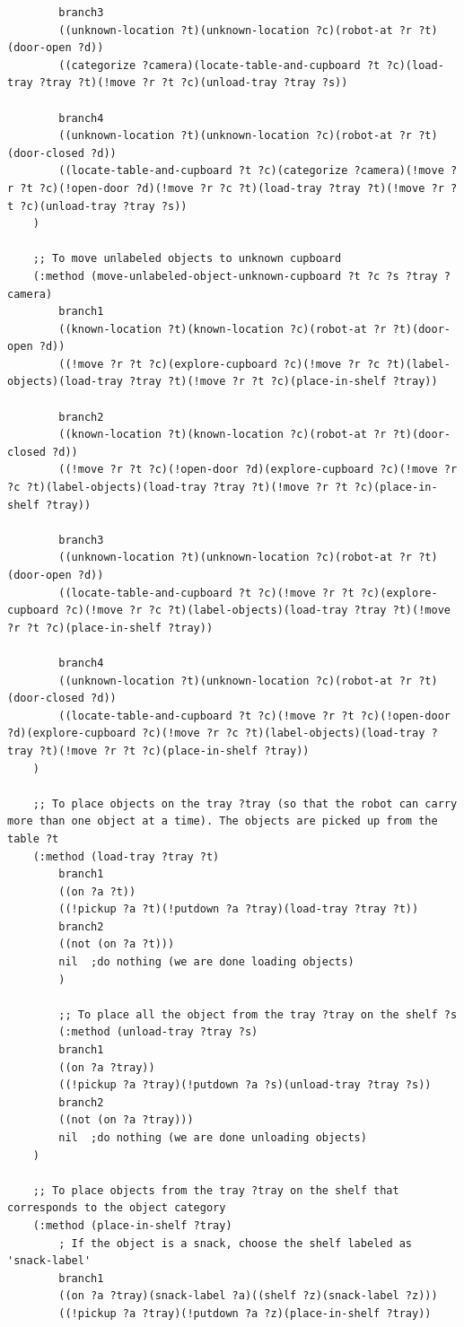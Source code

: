 \documentclass[paper=a4, fontsize=11pt]{scrartcl}
\begin{document}
\begin{lstlisting}
		branch3
		((unknown-location ?t)(unknown-location ?c)(robot-at ?r ?t)(door-open ?d))
		((categorize ?camera)(locate-table-and-cupboard ?t ?c)(load-tray ?tray ?t)(!move ?r ?t ?c)(unload-tray ?tray ?s))

		branch4
		((unknown-location ?t)(unknown-location ?c)(robot-at ?r ?t)(door-closed ?d))
		((locate-table-and-cupboard ?t ?c)(categorize ?camera)(!move ?r ?t ?c)(!open-door ?d)(!move ?r ?c ?t)(load-tray ?tray ?t)(!move ?r ?t ?c)(unload-tray ?tray ?s))
	)

	;; To move unlabeled objects to unknown cupboard
	(:method (move-unlabeled-object-unknown-cupboard ?t ?c ?s ?tray ?camera)
		branch1
		((known-location ?t)(known-location ?c)(robot-at ?r ?t)(door-open ?d))
		((!move ?r ?t ?c)(explore-cupboard ?c)(!move ?r ?c ?t)(label-objects)(load-tray ?tray ?t)(!move ?r ?t ?c)(place-in-shelf ?tray))

		branch2
		((known-location ?t)(known-location ?c)(robot-at ?r ?t)(door-closed ?d))
		((!move ?r ?t ?c)(!open-door ?d)(explore-cupboard ?c)(!move ?r ?c ?t)(label-objects)(load-tray ?tray ?t)(!move ?r ?t ?c)(place-in-shelf ?tray))

		branch3
		((unknown-location ?t)(unknown-location ?c)(robot-at ?r ?t)(door-open ?d))
		((locate-table-and-cupboard ?t ?c)(!move ?r ?t ?c)(explore-cupboard ?c)(!move ?r ?c ?t)(label-objects)(load-tray ?tray ?t)(!move ?r ?t ?c)(place-in-shelf ?tray))

		branch4
		((unknown-location ?t)(unknown-location ?c)(robot-at ?r ?t)(door-closed ?d))
		((locate-table-and-cupboard ?t ?c)(!move ?r ?t ?c)(!open-door ?d)(explore-cupboard ?c)(!move ?r ?c ?t)(label-objects)(load-tray ?tray ?t)(!move ?r ?t ?c)(place-in-shelf ?tray))
	)

	;; To place objects on the tray ?tray (so that the robot can carry more than one object at a time). The objects are picked up from the table ?t
	(:method (load-tray ?tray ?t)
		branch1
		((on ?a ?t))
		((!pickup ?a ?t)(!putdown ?a ?tray)(load-tray ?tray ?t))
		branch2
		((not (on ?a ?t)))
		nil  ;do nothing (we are done loading objects)
		)

		;; To place all the object from the tray ?tray on the shelf ?s
		(:method (unload-tray ?tray ?s)
		branch1
		((on ?a ?tray))
		((!pickup ?a ?tray)(!putdown ?a ?s)(unload-tray ?tray ?s))
		branch2
		((not (on ?a ?tray)))
		nil  ;do nothing (we are done unloading objects)
	)

	;; To place objects from the tray ?tray on the shelf that corresponds to the object category
	(:method (place-in-shelf ?tray)
		; If the object is a snack, choose the shelf labeled as 'snack-label'
		branch1
		((on ?a ?tray)(snack-label ?a)((shelf ?z)(snack-label ?z)))
		((!pickup ?a ?tray)(!putdown ?a ?z)(place-in-shelf ?tray))


\end{lstlisting}
\end{document}
